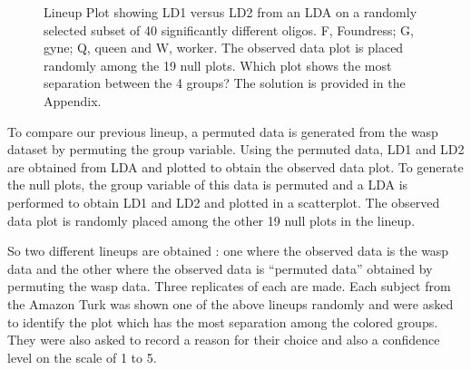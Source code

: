 \documentclass[12]{article}
\begin{document}
\begin{figure}[hbtp]
   \centering
       \caption{Lineup Plot showing LD1 versus LD2 from an LDA on a randomly selected subset of 40 significantly different oligos. F, Foundress; G, gyne; Q, queen and W, worker. The observed data plot is placed randomly among the 19 null plots. Which plot shows the most separation between the 4 groups? The solution is provided in the Appendix.}
       \label{toth_lineup}
\end{figure} 

To compare our previous lineup, a permuted data is generated from the wasp dataset by permuting the group variable. Using the permuted data, LD1 and LD2 are obtained from LDA and plotted to obtain the observed data plot. To generate the null plots, the group variable of this data is permuted and a LDA is performed to obtain LD1 and LD2 and plotted in a scatterplot. The observed data plot is randomly placed among the other 19 null plots in the lineup. 

So two different lineups are obtained : one where the observed data is the wasp data and the other where the observed data is ``permuted data'' obtained by permuting the wasp data. Three replicates of each are made. Each subject from the Amazon Turk was shown one of the above lineups randomly and were asked to identify the plot which has the most separation among the colored groups. They were also asked to record a reason for their choice and also a confidence level on the scale of 1 to 5.
\end{document}
